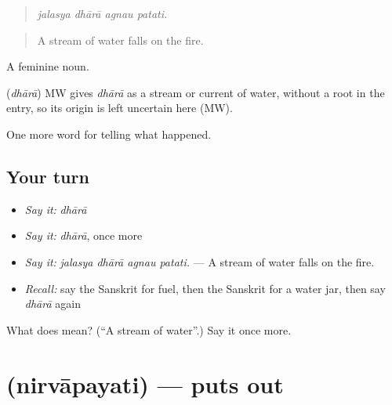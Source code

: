 \begin{quote}
   
\end{quote}

\begin{quote}
\emph{jalasya dhārā agnau patati.}
\end{quote}

\begin{quote}
A stream of water falls on the fire.
\end{quote}

A feminine noun.

\begin{cousinweb}
\textbf{} (\emph{dhārā}) MW gives \emph{dhārā} as a stream or current of water, without a root in the entry, so its origin is left uncertain here (MW).
\end{cousinweb}

\begin{grammarlens}[title={What you've built}]
One more word for telling what happened.
\end{grammarlens}

\subsection*{Your turn}
\begin{itemize}
\raggedright
  \item \emph{Say it:} \emph{dhārā}
  \item \emph{Say it:} \emph{dhārā}, once more
  \item \emph{Say it:} \emph{jalasya dhārā agnau patati.} — A stream of water falls on the fire.
  \item \emph{Recall:} say the Sanskrit for fuel, then the Sanskrit for a water jar, then say \emph{dhārā} again
\end{itemize}

\begin{tcolorbox}[breakable,colback=teal!4,colframe=teal!35!black,title={Before you move on}]
What does  mean? (\textquotedblleft{}A stream of water\textquotedblright{}.) Say it once more.
\end{tcolorbox}
\section[\texorpdfstring{\sk{निर्वापयति} (nirvāpayati)}{निर्वापयति (nirvāpayati)}]{ (nirvāpayati) — puts out}

\label{lesson:SA-C297-nirvapayati}




